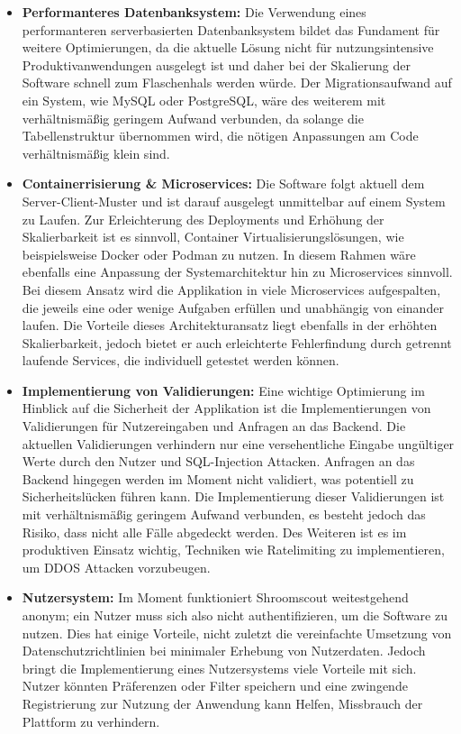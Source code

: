 \begin{itemize}

	\item \textbf{Performanteres Datenbanksystem:}
	      Die Verwendung eines performanteren serverbasierten Datenbanksystem bildet das Fundament für weitere Optimierungen, da die aktuelle Lösung nicht für
	      nutzungsintensive Produktivanwendungen ausgelegt ist und daher bei der Skalierung der Software schnell zum Flaschenhals werden würde. Der Migrationsaufwand
	      auf ein System, wie MySQL oder PostgreSQL, wäre des weiterem mit verhältnismäßig geringem Aufwand verbunden, da solange die Tabellenstruktur übernommen wird,
	      die nötigen Anpassungen am Code verhältnismäßig klein sind.

	\item \textbf{Containerrisierung \& Microservices:}
	      Die Software folgt aktuell dem Server-Client-Muster und ist darauf ausgelegt unmittelbar auf einem System zu Laufen. Zur Erleichterung des Deployments und
	      Erhöhung der Skalierbarkeit ist es sinnvoll, Container Virtualisierungslösungen, wie beispielsweise Docker oder Podman zu nutzen. In diesem Rahmen wäre ebenfalls
	      eine Anpassung der Systemarchitektur hin zu Microservices sinnvoll. Bei diesem Ansatz wird die Applikation in viele Microservices aufgespalten, die jeweils eine
	      oder wenige Aufgaben erfüllen und unabhängig von einander laufen. Die Vorteile dieses Architekturansatz liegt ebenfalls in der erhöhten Skalierbarkeit, jedoch
	      bietet er auch erleichterte Fehlerfindung durch getrennt laufende Services, die individuell getestet werden können.

	\item \textbf{Implementierung von Validierungen:}
	      Eine wichtige Optimierung im Hinblick auf die Sicherheit der Applikation ist die Implementierungen von Validierungen für Nutzereingaben und Anfragen an das Backend.
	      Die aktuellen Validierungen verhindern nur eine versehentliche Eingabe ungültiger Werte durch den Nutzer und SQL-Injection Attacken. Anfragen an das Backend hingegen
	      werden im Moment nicht validiert, was potentiell zu Sicherheitslücken führen kann. Die Implementierung dieser Validierungen ist mit verhältnismäßig geringem Aufwand
	      verbunden, es besteht jedoch das Risiko, dass nicht alle Fälle abgedeckt werden. Des Weiteren ist es im produktiven Einsatz wichtig, Techniken wie Ratelimiting zu
	      implementieren, um DDOS Attacken vorzubeugen.

	\item \textbf{Nutzersystem:}
	      Im Moment funktioniert Shroomscout weitestgehend anonym; ein Nutzer muss sich also nicht authentifizieren, um die Software zu nutzen. Dies hat einige Vorteile,
	      nicht zuletzt die vereinfachte Umsetzung von Datenschutzrichtlinien bei minimaler Erhebung von Nutzerdaten. Jedoch bringt die Implementierung eines Nutzersystems
	      viele Vorteile mit sich. Nutzer könnten Präferenzen oder Filter speichern und eine zwingende Registrierung zur Nutzung der Anwendung kann Helfen, Missbrauch der
	      Plattform zu verhindern.


\end{itemize}
